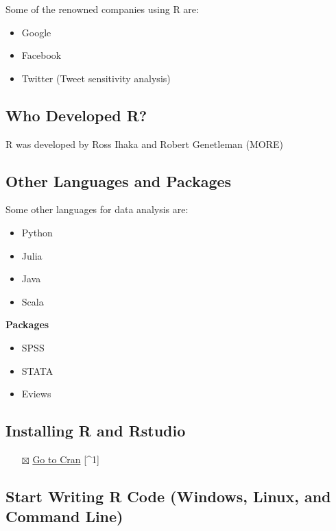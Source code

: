 \documentclass[
]{book}
\providecommand{\tightlist}{%
  \setlength{\itemsep}{0pt}\setlength{\parskip}{0pt}}
\begin{document}
Some of the renowned companies using R are:

\begin{itemize}
\tightlist
\item
  Google
\item
  Facebook
\item
  Twitter (Tweet sensitivity analysis)
\end{itemize}

\hypertarget{who-developed-r}{%
\subsection{Who Developed R?}\label{who-developed-r}}

R was developed by Ross Ihaka and Robert Genetleman ({MORE})

\hypertarget{other-languages-and-packages}{%
\subsection{Other Languages and Packages}\label{other-languages-and-packages}}

Some other languages for data analysis are:

\begin{itemize}
\tightlist
\item
  Python
\item
  Julia
\item
  Java
\item
  Scala
\end{itemize}

\textbf{Packages}

\begin{itemize}
\tightlist
\item
  SPSS
\item
  STATA
\item
  Eviews
\end{itemize}

\hypertarget{installing-r-and-rstudio}{%
\subsection{Installing R and Rstudio}\label{installing-r-and-rstudio}}

\begin{itemize}
\tightlist
\item[$\boxtimes$]
  \href{https://cran.r-project.org}{Go to Cran} {[}\^{}1{]}
\end{itemize}

\hypertarget{start-writing-r-code-windows-linux-and-command-line}{%
\subsection{Start Writing R Code (Windows, Linux, and Command Line)}\label{start-writing-r-code-windows-linux-and-command-line}}
\end{document}
